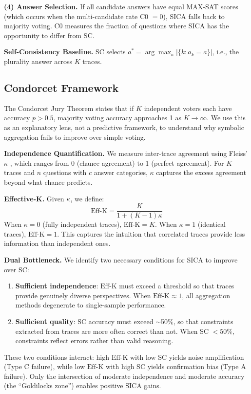 \documentclass[11pt,a4paper]{article}
\newcommand{\effk}{\text{Eff-K}}
\begin{document}
\textbf{(4) Answer Selection.} If all candidate answers have equal MAX-SAT scores (which occurs when the multi-candidate rate C0 $= 0$), SICA falls back to majority voting. C0 measures the fraction of questions where SICA has the opportunity to differ from SC.

\textbf{Self-Consistency Baseline.} SC selects $a^* = \arg\max_a |\{k : a_k = a\}|$, i.e., the plurality answer across $K$ traces.

\subsection{Condorcet Framework}
\label{sec:condorcet}

The Condorcet Jury Theorem states that if $K$ independent voters each have accuracy $p > 0.5$, majority voting accuracy approaches 1 as $K \to \infty$. We use this as an explanatory lens, not a predictive framework, to understand why symbolic aggregation fails to improve over simple voting.

\textbf{Independence Quantification.} We measure inter-trace agreement using Fleiss' $\kappa$ \citep{fleiss1971}, which ranges from 0 (chance agreement) to 1 (perfect agreement). For $K$ traces and $n$ questions with $c$ answer categories, $\kappa$ captures the excess agreement beyond what chance predicts.

\textbf{Effective-K.} Given $\kappa$, we define:
\begin{equation}
    \effk = \frac{K}{1 + (K-1)\kappa}
    \label{eq:effk}
\end{equation}
When $\kappa = 0$ (fully independent traces), $\effk = K$. When $\kappa = 1$ (identical traces), $\effk = 1$. This captures the intuition that correlated traces provide less information than independent ones.

\textbf{Dual Bottleneck.} We identify two necessary conditions for SICA to improve over SC:
\begin{enumerate}
    \item \textbf{Sufficient independence}: $\effk$ must exceed a threshold so that traces provide genuinely diverse perspectives. When $\effk \approx 1$, all aggregation methods degenerate to single-sample performance.
    \item \textbf{Sufficient quality}: SC accuracy must exceed $\sim$50\%, so that constraints extracted from traces are more often correct than not. When SC $< 50\%$, constraints reflect errors rather than valid reasoning.
\end{enumerate}
These two conditions interact: high $\effk$ with low SC yields noise amplification (Type C failure), while low $\effk$ with high SC yields confirmation bias (Type A failure). Only the intersection of moderate independence and moderate accuracy (the ``Goldilocks zone'') enables positive SICA gains.
\end{document}
